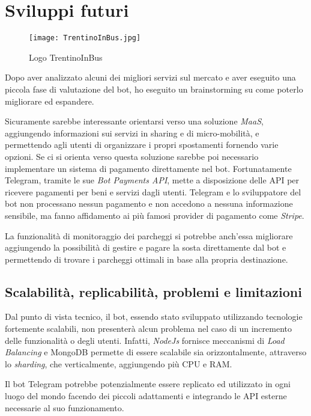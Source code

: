 \section{Sviluppi futuri}

\begin{wrapfigure}{r}{0.38\textwidth}
\centering
\texttt{[image: TrentinoInBus.jpg]}
\caption{Logo TrentinoInBus}
\label{fig:trentino_in_bus}
\end{wrapfigure}

Dopo aver analizzato alcuni dei migliori servizi sul mercato e aver eseguito una piccola fase di valutazione del bot, ho eseguito un brainstorming su come poterlo migliorare ed espandere. 

Sicuramente sarebbe interessante orientarsi verso una soluzione \textit{MaaS}, aggiungendo informazioni sui servizi in sharing e di micro-mobilità, e permettendo agli utenti di organizzare i propri spostamenti fornendo varie opzioni. Se ci si orienta verso questa soluzione sarebbe poi necessario implementare un sistema di pagamento direttamente nel bot. Fortunatamente Telegram, tramite le sue \textit{Bot Payments API}, mette a disposizione delle API per ricevere pagamenti per beni e servizi dagli utenti. Telegram e lo sviluppatore del bot non processano nessun pagamento e non accedono a nessuna informazione sensibile, ma fanno affidamento ai più famosi provider di pagamento come \textit{Stripe}.

La funzionalità di monitoraggio dei parcheggi si potrebbe anch'essa migliorare aggiungendo la possibilità di gestire e pagare la sosta direttamente dal bot e permettendo di trovare i parcheggi ottimali in base alla propria destinazione.

\subsection{Scalabilità, replicabilità, problemi e limitazioni}
\label{sec:scalabilita}
Dal punto di vista tecnico, il bot, essendo stato sviluppato utilizzando tecnologie fortemente scalabili, non presenterà alcun problema nel caso di un incremento delle funzionalità o degli utenti. Infatti, \textit{NodeJs} fornisce meccanismi di \textit{Load Balancing} e MongoDB permette di essere scalabile sia orizzontalmente, attraverso lo \textit{sharding}, che verticalmente, aggiungendo più CPU e RAM.


Il bot Telegram  potrebbe potenzialmente essere replicato ed utilizzato in ogni luogo del mondo facendo dei piccoli adattamenti e integrando le API esterne necessarie al suo funzionamento.


